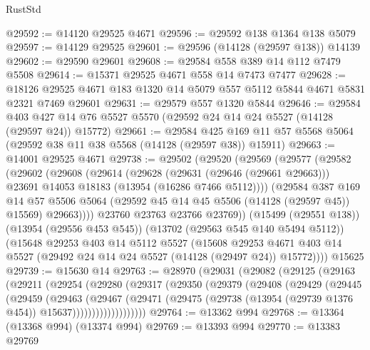 \begin{lexlean}{RustStd}
\begin{coremodule}
@29592 := @14120 @29525 @4671
@29596 := @29592 @138 @1364 @138 @5079
@29597 := @14129 @29525
@29601 := @29596 (@14128 (@29597 @138)) @14139
@29602 := @29590 @29601
@29608 := @29584 @558 @389 @14 @112 @7479 @5508
@29614 := @15371 @29525 @4671 @558 @14 @7473 @7477
@29628 := @18126 @29525 @4671 @183 @1320 @14 @5079 @557 @5112 @5844 @4671 @5831 @2321 @7469 @29601
@29631 := @29579 @557 @1320 @5844
@29646 := @29584
    @403
    @427
    @14
    @76
    @5527
    @5570
    (@29592 @24 @14 @24 @5527 (@14128 (@29597 @24)) @15772)
@29661 := @29584
    @425
    @169
    @11
    @57
    @5568
    @5064
    (@29592 @38 @11 @38 @5568 (@14128 (@29597 @38)) @15911)
@29663 := @14001 @29525 @4671
@29738 := @29502
    (@29520
      (@29569
        (@29577
          (@29582
            (@29602
              (@29608
                (@29614
                  (@29628
                    (@29631 (@29646 (@29661 @29663)))
                    @23691
                    @14053
                    @18183
                    (@13954 (@16286 @7466 @5112))))
                (@29584
                  @387
                  @169
                  @14
                  @57
                  @5506
                  @5064
                  (@29592 @45 @14 @45 @5506 (@14128 (@29597 @45)) @15569)
                  @29663))))
          @23760
          @23763
          @23766
          @23769))
      (@15499 (@29551 @138))
      (@13954 (@29556 @453 @545))
      (@13702 (@29563 @545 @140 @5494 @5112))
      (@15648
        @29253
        @403
        @14
        @5112
        @5527
        (@15608
          @29253
          @4671
          @403
          @14
          @5527
          (@29492 @24 @14 @24 @5527 (@14128 (@29497 @24)) @15772))))
    @15625
@29739 := @15630 @14
@29763 := @28970
    (@29031
      (@29082
        (@29125
          (@29163
            (@29211
              (@29254
                (@29280
                  (@29317
                    (@29350
                      (@29379
                        (@29408
                          (@29429
                            (@29445
                              (@29459
                                (@29463
                                  (@29467
                                    (@29471
                                      (@29475
                                        (@29738
                                          (@13954 (@29739 @1376 @454))
                                          @15637)))))))))))))))))))
@29764 := @13362 @994
@29768 := @13364 (@13368 @994) (@13374 @994)
@29769 := @13393 @994
@29770 := @13383 @29769

\end{coremodule}
\end{lexlean}
